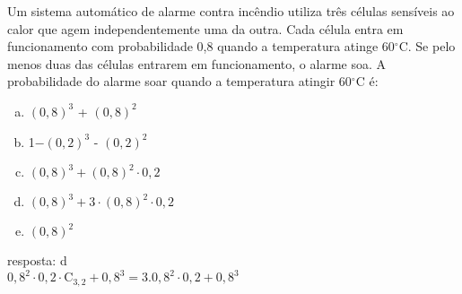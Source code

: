 \begin{ex}
 Um sistema automático de alarme contra incêndio utiliza três células sensíveis ao calor que agem independentemente uma da outra. Cada célula entra em funcionamento com probabilidade 0,8 quando a temperatura atinge 60$^{\circ}$C. Se pelo menos duas das células entrarem em funcionamento, o alarme soa. A probabilidade do alarme soar quando a temperatura atingir 60$^{\circ}$C é:
    \begin{enumerate}[(a)]
    \item $(0,8)^3$ + $(0,8)^2$
    \item 1$- (0,2)^3$ - $(0,2)^2$
    \item $(0,8)^3 + (0,8)^2\cdot 0,2 $ 
    \item $(0,8)^3 + 3\cdot(0,8)^2\cdot0,2$
    \item $(0,8)^2$
    \end{enumerate}
      \begin{sol}
      resposta: d\\
        $0,8^2\cdot0,2\cdot\mathrm{C}_{3,2}+0,8^3=3.0,8^2\cdot0,2+0,8^3$
      \end{sol}
\end{ex}